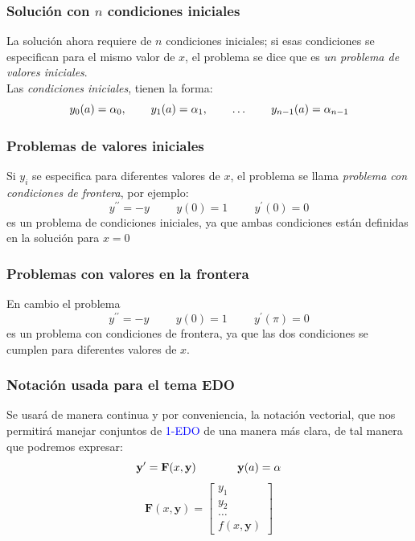 \begin{frame}
\frametitle{Solución con $n$ condiciones iniciales}
La solución ahora requiere de $n$ condiciones iniciales; si esas condiciones se especifican para el mismo valor de $x$, el problema se dice que es \emph{un problema de valores iniciales}.
\\
\medskip
Las \emph{condiciones iniciales}, tienen la forma:
\[ y_{0}(a) = \alpha_{0}, \hspace{0.75cm} y_{1}(a) = \alpha_{1}, \hspace{0.75cm} \ldots \hspace{0.75cm} y_{n - 1}(a) = \alpha_{n-1}\]
\end{frame}
\begin{frame}
\frametitle{Problemas de valores iniciales}
Si $y_{i}$ se especifica para diferentes valores de $x$, el problema se llama \emph{problema con condiciones de frontera}, por ejemplo:
\[ y^{\prime \prime} = -y \hspace{1cm} y(0)=1 \hspace{1cm} y^{\prime}(0) = 0\]
es un problema de condiciones iniciales, ya que ambas condiciones están definidas en la solución para $x = 0$
\end{frame}
\begin{frame}
\frametitle{Problemas con valores en la frontera}
En cambio el problema
\[ y^{\prime \prime} = - y \hspace{1cm} y(0) = 1 \hspace{1cm} y^{\prime}(\pi) = 0\]
es un problema con condiciones de frontera, ya que las dos condiciones se cumplen para diferentes valores de $x$.
\end{frame}
\begin{frame}
\frametitle{Notación usada para el tema EDO}
Se usará de manera continua y por conveniencia, la notación vectorial, que nos permitirá manejar conjuntos de \textcolor{blue}{1-EDO} de una manera más clara, de tal manera que podremos expresar:
\[ \mathbf{y}^{\prime} = \mathbf{F}(x,\mathbf{y}) \hspace{1.3cm} \mathbf{y}(a) = \alpha\]
\[ \mathbf{F}(x,\mathbf{y}) = \left[ \begin{matrix}
y_{1} \\
y_{2} \\
\ldots \\
f(x,\mathbf{y})
\end{matrix} \right] \]
\end{frame}
